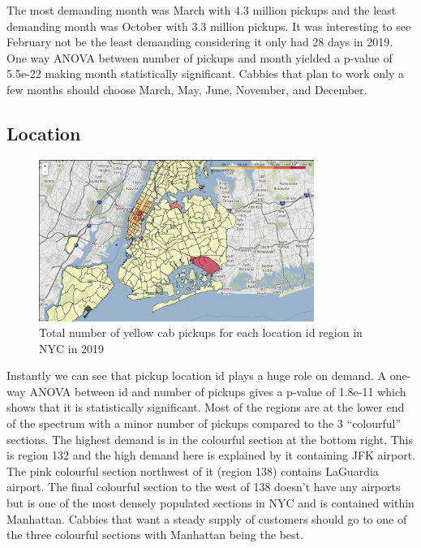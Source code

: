 \documentclass[11pt]{article}
\begin{document}
The most demanding month was March with 4.3 million pickups and the least demanding month was October with 3.3 million pickups. It was interesting to see February not be the least demanding considering it only had 28 days in 2019. One way ANOVA between number of pickups and month yielded a p-value of 5.5e-22 making month statistically significant. Cabbies that plan to work only a few months should choose March, May, June, November, and December.

\subsection{Location}

\begin{figure}[h]
    \includegraphics[width=0.8\textwidth]{plots/map.png}
    \centering
    \caption{Total number of yellow cab pickups for each location id region in NYC in 2019} %
\end{figure}

Instantly we can see that pickup location id plays a huge role on demand. A one-way ANOVA between id and number of pickups gives a p-value of 1.8e-11 which shows that it is statistically significant. Most of the regions are at the lower end of the spectrum with a minor number of pickups compared to the 3 “colourful” sections. The highest demand is in the colourful section at the bottom right. This is region 132 and the high demand here is explained by it containing JFK airport. The pink colourful section northwest of it (region 138) contains LaGuardia airport. The final colourful section to the west of 138 doesn’t have any airports but is one of the most densely populated sections in NYC and is contained within Manhattan. Cabbies that want a steady supply of customers should go to one of the three colourful sections with Manhattan being the best.
\end{document}
